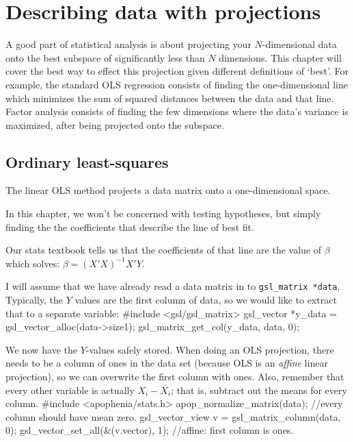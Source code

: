 \chapter[Projections]{Describing data with projections} \label{projections}

A good part of statistical analysis is about projecting your
$N$-dimensional data onto the best subspace of significantly less than
$N$ dimensions. This chapter will cover the best way to effect this projection
given different definitions of `best'.
 For example, the standard OLS regression consists of
finding the one-dimensional line which minimizes the sum of squared
distances between the data and that line. Factor analysis consists
of finding the few dimensions where the data's variance is maximized, after being
projected onto the subspace.

\section{Ordinary least-squares} The linear OLS method
projects a data matrix onto a one-dimensional space. 



In this chapter, we won't be concerned with testing hypotheses, but simply finding the 
the coefficients that describe the line of best fit.

Our stats textbook tells us that the coefficients of  that line are the value of $\beta$ which solves:
$ \beta = (X'X)^{-1}X'Y$.

I will assume that we have already read a data matrix in to {\tt gsl\_matrix *data}. Typically, the $Y$
values are the first column of data, so we would like to extract that to a separate variable:
#include <gsl/gsl_matrix>
gsl_vector      *y_data         = gsl_vector_alloc(data->size1);
gsl_matrix_get_col(y_data, data, 0);


We now have the $Y$-values safely stored.  When doing an OLS projection, there needs to be a column of
ones in the data set (because OLS is an {\sl affine} linear projection), so we can overwrite the first
column with ones. Also, remember that every other variable is actually
$X_i - \bar{X_i}$; that is, subtract out the means for every column.
#include <apophenia/stats.h>
        apop_normalize_matrix(data);            //every column should have mean zero.
gsl_vector_view v         = gsl_matrix_column(data, 0);
        gsl_vector_set_all(&(v.vector), 1);     //affine: first column is ones.




